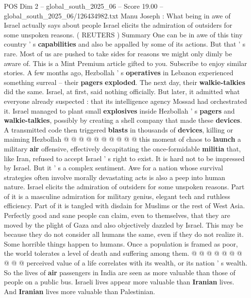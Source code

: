\begin{textsample}{POS Dim 2 – global\_south\_2025\_06 – Score 19.00 – global\_south\_2025\_06/126434982.txt}  \label{ex:f2_pos_249}
Manu Joseph : What being in awe of Israel actually says about people Israel elicits the admiration of outsiders for some unspoken reasons. ( REUTERS ) Summary One can be in awe of this tiny country ' s \textbf{capabilities} and also be appalled by some of its actions.
But that ' s rare.
Most of us are pushed to take sides for reasons we might only dimly be aware of.
This is a Mint Premium article gifted to you.
Subscribe to enjoy similar stories.
A few months ago, Hezbollah ' s \textbf{operatives} in Lebanon experienced something surreal -- their \textbf{pagers} \textbf{exploded}.
The next day, their \textbf{walkie-talkies} did the same.
Israel, at first, said nothing officially.
But later, it admitted what everyone already suspected : that its intelligence agency Mossad had orchestrated it.
Israel managed to plant small \textbf{explosives} inside Hezbollah ' s \textbf{pagers} and \textbf{walkie-talkies}, possibly by creating a shell company that made these \textbf{devices}.
A transmitted code then triggered \textbf{blasts} in thousands of \textbf{devices}, killing or maiming Hezbollah @ @ @ @ @ @ @ @ @ @ this moment of chaos to \textbf{launch} a military \textbf{air} offensive, effectively decapitating the once-formidable \textbf{militia} that, like Iran, refused to accept Israel ' s right to exist.
It is hard not to be impressed by Israel.
But it ' s a complex sentiment.
Awe for a nation whose survival strategies often involve morally devastating acts is also a peep into human nature.
Israel elicits the admiration of outsiders for some unspoken reasons.
Part of it is a masculine admiration for military genius, elegant tech and ruthless efficiency.
Part of it is tangled with disdain for Muslims or the rest of West Asia.
Perfectly good and sane people can claim, even to themselves, that they are moved by the plight of Gaza and also objectively dazzled by Israel.
This may be because they do not consider all humans the same, even if they do not realize it.
Some horrible things happen to humans.
Once a population is framed as poor, the world tolerates a level of death and suffering among them. @ @ @ @ @ @ @ @ @ @ perceived value of a life correlates with its wealth, or its nation ' s wealth.
So the lives of \textbf{air} passengers in India are seen as more valuable than those of people on a public bus.
Israeli lives appear more valuable than \textbf{Iranian} lives.
And \textbf{Iranian} lives more valuable than Palestinian.

\end{textsample}
